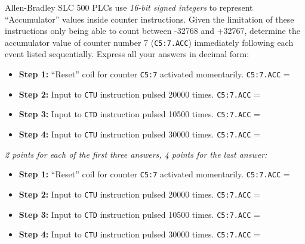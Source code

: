 

Allen-Bradley SLC 500 PLCs use {\it 16-bit signed integers} to represent ``Accumulator'' values inside counter instructions.  Given the limitation of these instructions only being able to count between -32768 and +32767, determine the accumulator value of counter number 7 ({\tt C5:7.ACC}) immediately following each event listed sequentially.  Express all your answers in decimal form:

\vskip 10pt

\begin{itemize}
\item{} {\bf Step 1:} ``Reset'' coil for counter {\tt C5:7} activated momentarily.  {\tt C5:7.ACC} = \underbar{\hskip 50pt}
\vskip 10pt
\item{} {\bf Step 2:} Input to {\tt CTU} instruction pulsed 20000 times.  {\tt C5:7.ACC} = \underbar{\hskip 50pt} 
\vskip 10pt
\item{} {\bf Step 3:} Input to {\tt CTD} instruction pulsed 10500 times.  {\tt C5:7.ACC} = \underbar{\hskip 50pt} 
\vskip 10pt
\item{} {\bf Step 4:} Input to {\tt CTU} instruction pulsed 30000 times.  {\tt C5:7.ACC} = \underbar{\hskip 50pt} 
\end{itemize}







{\it 2 points for each of the first three answers, 4 points for the last answer:}

\begin{itemize}
\item{} {\bf Step 1:} ``Reset'' coil for counter {\tt C5:7} activated momentarily.  {\tt C5:7.ACC} = 
\item{} {\bf Step 2:} Input to {\tt CTU} instruction pulsed 20000 times.  {\tt C5:7.ACC} =  
\item{} {\bf Step 3:} Input to {\tt CTD} instruction pulsed 10500 times.  {\tt C5:7.ACC} =  
\item{} {\bf Step 4:} Input to {\tt CTU} instruction pulsed 30000 times.  {\tt C5:7.ACC} =  
\end{itemize}

